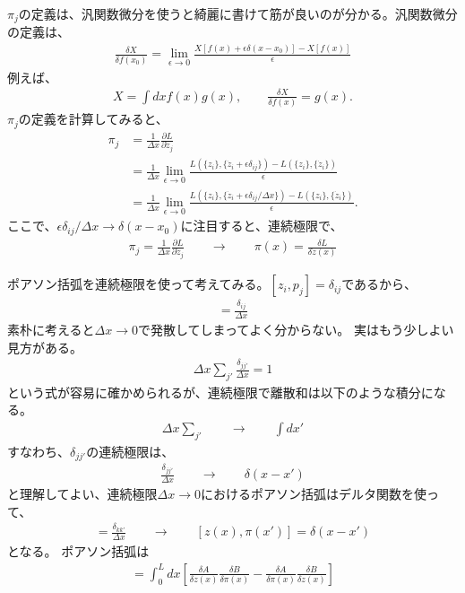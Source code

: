 \documentclass[10pt,a4paper]{jarticle}
\begin{document}
$\pi_j$の定義は、汎関数微分を使うと綺麗に書けて筋が良いのが分かる。汎関数微分の定義は、
\begin{align}
\frac{\delta X}{\delta f(x_0)} = \lim_{\epsilon \to 0} \frac{X[f(x) + \epsilon \delta(x-x_0)]-X[f(x)]}{\epsilon}
\end{align}
例えば、
\begin{align}
X = \int dx f(x) g(x), \qquad
\frac{\delta X}{\delta f(x)} = g(x).
\end{align}
%
$\pi_j$の定義を計算してみると、
\begin{align}
\pi_j
&= \frac{1}{\Delta x}\frac{\partial L}{\partial \dot z_j} \nonumber\\
&= \frac{1}{\Delta x} \lim_{\epsilon \to 0} \frac{L(\{z_i\}, \{\dot z_i + \epsilon \delta_{ij} \}) - L(\{z_i\}, \{\dot z_i\}) }{\epsilon} \nonumber\\
&= \frac{1}{\Delta x} \lim_{\epsilon \to 0} \frac{L(\{z_i\}, \{\dot z_i + \epsilon \delta_{ij}/\Delta x \}) - L(\{z_i\}, \{\dot z_i\}) }{\epsilon}.
\end{align}
%
ここで、$\epsilon \delta_{ij}/\Delta x \to \delta(x-x_0)$に注目すると、連続極限で、
\begin{align}
\pi_j = \frac{1}{\Delta x}\frac{\partial L}{\partial \dot z_j}
\qquad\rightarrow\qquad
\pi(x) = \frac{\delta L}{\delta \dot z(x)}
\end{align}

ポアソン括弧を連続極限を使って考えてみる。$[z_i, p_j] = \delta_{ij}$であるから、
\begin{align}
[z_i, \pi_j] = \frac{\delta_{ij}}{\Delta x}
\end{align}
素朴に考えると$\Delta x \to 0$で発散してしまってよく分からない。
実はもう少しよい見方がある。
\begin{align}
\Delta x \sum_{j'} \frac{\delta_{j j'}}{\Delta x} = 1
\end{align}
という式が容易に確かめられるが、連続極限で離散和は以下のような積分になる。
\begin{align}
\Delta x \sum_{j'} \qquad\to\qquad \int dx'
\end{align}
すなわち、$\delta_{jj'}$の連続極限は、
\begin{align}
\frac{ \delta_{jj'} }{\Delta x} \qquad\to\qquad \delta(x-x')
\end{align}
と理解してよい、連続極限$\Delta x\to 0$におけるポアソン括弧はデルタ関数を使って、
\begin{align}
[z_j, \pi_{j'}] = \frac{\delta_{kk'}}{\Delta x}
\qquad\rightarrow\qquad
[z(x), \pi(x')] = \delta(x-x')
\end{align}
となる。
ポアソン括弧は
\begin{align}
[A,B] =
\int_0^L dx \left[ \frac{\delta A}{\delta z(x)} \frac{\delta B}{\delta \pi(x)} - \frac{\delta A}{\delta \pi(x)} \frac{\delta B}{\delta z(x)} \right]
\end{align}
\end{document}

